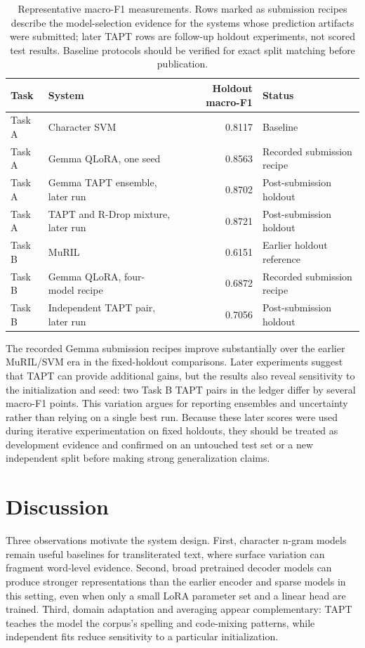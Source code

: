 \documentclass[10pt]{article}
\newcommand{\taska}{Task A}
\newcommand{\taskb}{Task B}
\begin{document}
\begin{table}[t]
\centering
\small
\begin{tabular}{llrl}
\toprule
Task & System & Holdout macro-F1 & Status \\
\midrule
\taska{} & Character SVM & 0.8117 & Baseline \\
\taska{} & Gemma QLoRA, one seed & 0.8563 & Recorded submission recipe \\
\taska{} & Gemma TAPT ensemble, later run & 0.8702 & Post-submission holdout \\
\taska{} & TAPT and R-Drop mixture, later run & 0.8721 & Post-submission holdout \\
\midrule
\taskb{} & MuRIL & 0.6151 & Earlier holdout reference \\
\taskb{} & Gemma QLoRA, four-model recipe & 0.6872 & Recorded submission recipe \\
\taskb{} & Independent TAPT pair, later run & 0.7056 & Post-submission holdout \\
\bottomrule
\end{tabular}
\caption{Representative macro-F1 measurements. Rows marked as submission recipes
describe the model-selection evidence for the systems whose prediction artifacts were
submitted; later TAPT rows are follow-up holdout experiments, not scored test results.
Baseline protocols should be verified for exact split matching before publication.}
\label{tab:results}
\end{table}

The recorded Gemma submission recipes improve substantially over the earlier
MuRIL/SVM era in the fixed-holdout comparisons. Later experiments suggest that
TAPT can provide additional gains, but the results also reveal sensitivity to
the initialization and seed: two Task B TAPT pairs in the ledger differ by
several macro-F1 points. This variation argues for reporting ensembles and
uncertainty rather than relying on a single best run. Because these later scores
were used during iterative experimentation on fixed holdouts, they should be
treated as development evidence and confirmed on an untouched test set or a
new independent split before making strong generalization claims.

\section{Discussion}
Three observations motivate the system design. First, character n-gram models
remain useful baselines for transliterated text, where surface variation can
fragment word-level evidence. Second, broad pretrained decoder models can
produce stronger representations than the earlier encoder and sparse models in
this setting, even when only a small LoRA parameter set and a linear head are
trained. Third, domain adaptation and averaging appear complementary: TAPT
teaches the model the corpus's spelling and code-mixing patterns, while
independent fits reduce sensitivity to a particular initialization.
\end{document}
